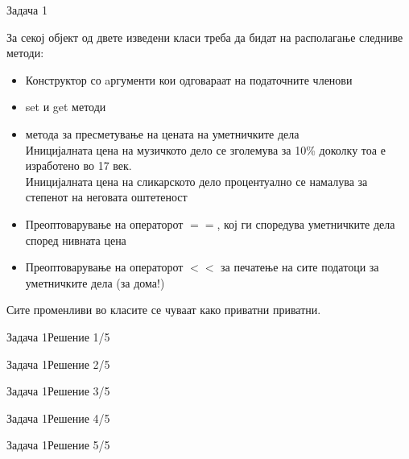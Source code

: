 \begin{frame}{Задача 1}
\begin{scriptsize}
За секој објект од двете изведени класи треба да бидат на располагање следниве
методи: 
\begin{itemize}
  \item Конструктор со aргументи кои одговараат на податочните членови
  \item set и get методи
  \item метода за пресметување на цената на уметничките дела \\
  Иницијалната цена на музичкото дело се зголемува за 10\% доколку тоа е
  изработено во 17 век.\\
  Иницијалната цена на сликарското дело процентуално се
намалува за степенот на неговата оштетеност
\item Преоптоварување на операторот $==$, кој ги споредува уметничките дела
според нивната цена
\item Преоптоварување на операторот $<<$ за печатење на сите податоци
за уметничките дела (за дома!) 
\end{itemize}
Сите променливи во класите се чуваат како приватни приватни.

\end{scriptsize}
\end{frame}


\begin{frame}[fragile]{Задача 1}{Решение 1/5}

\end{frame}

\begin{frame}[fragile]{Задача 1}{Решение 2/5}

\end{frame}
\begin{frame}[fragile]{Задача 1}{Решение 3/5}

\end{frame}
\begin{frame}[fragile]{Задача 1}{Решение 4/5}

\end{frame}
\begin{frame}[fragile]{Задача 1}{Решение 5/5}

\end{frame}

